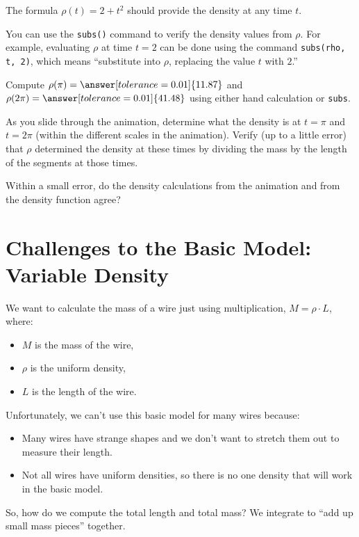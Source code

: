 \documentclass{ximera}
\begin{document}
The formula $\rho(t) = 2 + t^2$ should provide the density at any time $t$. 

You can use the \texttt{subs()} command to verify the density values from $\rho$. For example, evaluating $\rho$ at time $t=2$ can be done using the command \texttt{subs(rho, t, 2)}, which means ``substitute into $\rho$, replacing the value $t$ with $2$.''

\begin{problem}
Compute $\rho(\pi) = \answer[tolerance=0.01]{11.87}$ and $\rho(2\pi) = \answer[tolerance=0.01]{41.48}$ using either hand calculation or \texttt{subs}. 

As you slide through the animation, determine what the density is at $t=\pi$ and $t=2\pi$ (within the different scales in the animation). Verify (up to a little error) that $\rho$ determined the density at these times by dividing the mass by the length of the segments at those times.

Within a small error, do the density calculations from the animation and from the density function agree? 
\end{problem}

\section*{Challenges to the Basic Model: Variable Density}

We want to calculate the mass of a wire just using multiplication, $M = \rho \cdot L$, where:
\begin{itemize}
\item $M$ is the mass of the wire,
\item $\rho$ is the uniform density,
\item $L$ is the length of the wire.
\end{itemize}

Unfortunately, we can't use this basic model for many wires because:
\begin{itemize}
\item Many wires have strange shapes and we don't want to stretch them out to measure their length.
\item Not all wires have uniform densities, so there is no one density that will work in the basic model.
\end{itemize}

So, how do we compute the total length and total mass? We integrate to ``add up small mass pieces'' together.
\end{document}
